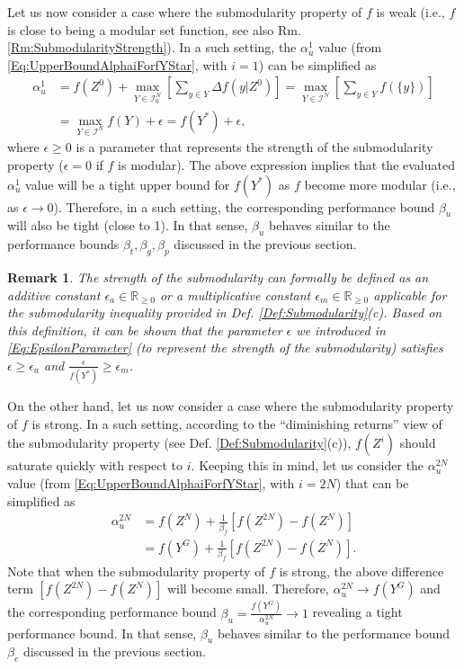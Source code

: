 \documentclass[letterpaper, 10 pt, conference]{ieeeconf}
\newcommand{\R}{\mathbb{R}}
\newtheorem{remark}{Remark}
\begin{document}
{%
Let us now consider a case where the submodularity property of $f$ is weak (i.e., $f$ is close to being a modular set function, see also Rm. \ref{Rm:SubmodularityStrength}). In a such setting, the $\alpha^1_u$ value (from \eqref{Eq:UpperBoundAlphaiForfYStar}, with $i=1$) can be simplified as
\begin{align}
    \alpha_u^1 
    &= f(Z^0)+\underset{Y\in\mathcal{I}^N_0}{\max}\left[\sum_{y\in Y}\Delta f(y\vert Z^0)\right] 
    = \underset{Y \in \mathcal{I}^N}{\max} \left[\sum_{y\in Y} f(\{y\}) \right]\nonumber \\\label{Eq:EpsilonParameter}
    &= \underset{Y \in \mathcal{I}^N}{\max} f(Y) + \epsilon = f(Y^*) + \epsilon, 
\end{align}
where $\epsilon\geq0$ is a parameter that represents the strength of the submodularity property ($\epsilon = 0$ if $f$ is modular). The above expression implies that the evaluated $\alpha_u^1$ value will be a tight upper bound for $f(Y^*)$ as $f$ become more modular (i.e., as $\epsilon\rightarrow 0$). Therefore, in a such setting, the corresponding performance bound $\beta_u$ will also be tight (close to 1). In that sense, $\beta_u$ behaves similar to the performance bounds $\beta_t,\beta_g,\beta_p$ discussed in the previous section. 


\begin{remark}
The strength of the submodularity can formally be defined as an additive constant $\epsilon_a\in\R_{\geq 0}$ or a multiplicative constant $\epsilon_m \in \R_{\geq 0}$ applicable for the submodularity inequality provided in Def. \ref{Def:Submodularity}(c). Based on this definition, it can be shown that the parameter $\epsilon$ we introduced in  \eqref{Eq:EpsilonParameter} (to represent the strength of the submodularity) satisfies $\epsilon \geq \epsilon_a$ and $\frac{\epsilon}{f(Y^*)} \geq \epsilon_m$. 
\end{remark}


On the other hand, let us now consider a case where the submodularity property of $f$ is strong. In a such setting, according to the ``diminishing returns'' view of the submodularity property (see Def. \ref{Def:Submodularity}(c)), $f(Z^i)$ should saturate quickly with respect to $i$. Keeping this in mind, let us consider the $\alpha^{2N}_u$ value (from \eqref{Eq:UpperBoundAlphaiForfYStar}, with $i=2N$) that can be simplified as 
\begin{align}
    \alpha^{2N}_u &= f(Z^N) + \frac{1}{\beta_f}\left[f(Z^{2N})-f(Z^{N})\right]\nonumber\\ 
    &= f(Y^G) + \frac{1}{\beta_f}\left[f(Z^{2N})-f(Z^{N})\right].\nonumber
\end{align}
Note that when the submodularity property of $f$ is strong, the above difference term $\left[f(Z^{2N})-f(Z^{N})\right]$ will become small. Therefore, $\alpha_u^{2N}\rightarrow f(Y^G)$ and the corresponding performance bound $\beta_u = \frac{f(Y^G)}{\alpha_u^{2N}}\rightarrow 1$ revealing a tight performance bound. In that sense, $\beta_u$ behaves similar to the performance bound $\beta_e$ discussed in the previous section. 


}
\end{document}
